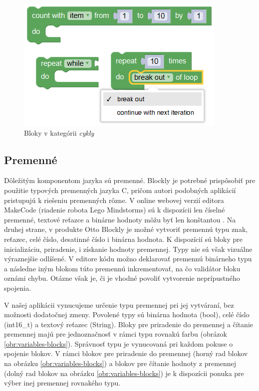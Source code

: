 \begin{figure}
\centerline{\includegraphics[]{images/loop-blocks}}
\caption[Bloky v kategórii \textit{cykly}]{Bloky v kategórii \textit{cykly}}
\label{obr:loop-blocks}
\end{figure}

\subsection{Premenné}
Dôležitým komponentom jazyka sú premenné. Blockly je potrebné prispôsobiť pre použitie typových premenných jazyka C, pričom autori podobných aplikácií pristupujú k riešeniu premenných rôzne. V online webovej verzií editora MakeCode (riadenie robota Lego Mindstorms) sú k dispozícii len číselné premenné, textové reťazce a binárne hodnoty môžu byť len konštantou \cite{makeCodeWebEditor}. Na druhej strane, v produkte Otto Blockly je možné vytvoriť premennú typu znak, reťazec, celé číslo, desatinné číslo i binárna hodnota. K dispozícií sú bloky pre inicializáciu, priradenie, i získanie hodnoty premennej. Typy nie sú však vizuálne výraznejšie odlíšené. V editore kódu možno deklarovať premennú binárneho typu a následne iným blokom túto premennú inkrementovať, na čo validátor bloku oznámi chybu. Otázne však je, či je vhodné povoliť vytvorenie neprípustného spojenia.

V našej aplikácii vynucujeme určenie typu premennej pri jej vytváraní, bez možnosti dodatočnej zmeny. Povolené typy sú binárna hodnota (bool), celé číslo (int16\_t) a textový reťazec (String). Bloky pre priradenie do premennej a čítanie premennej majú pre jednoznačnosť v rámci typu rovnakú farbu (obrázok \ref{obr:variables-blocks}). Správnosť typu je vynucovaná pri každom pokuse o spojenie blokov. V rámci blokov pre priradenie do premennej (horný rad blokov na obrázku \ref{obr:variables-blocks}) a blokov pre čítanie hodnoty z premennej (dolný rad blokov na obrázku \ref{obr:variables-blocks}) je k dispozícii ponuka pre výber inej premennej rovnakého typu.

